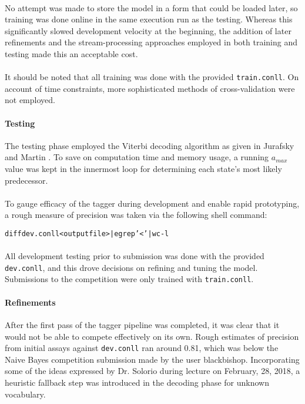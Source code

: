 \documentclass[11pt,a4paper]{article}
\begin{document}
\paragraph{}
No attempt was made to store the model in a form that could be loaded later,
so training was done online in the same execution run as the testing.
Whereas this significantly slowed development velocity at the beginning,
the addition of later refinements and the stream-processing approaches
employed in both training and testing made this an acceptable cost.

\paragraph{}
It should be noted that all training was done with the provided \texttt{train.conll}.
On account of time constraints, more sophisticated methods of cross-validation \cite[86-87]{JurafskyMartin}
were not employed.

\paragraph{Testing}
The testing phase employed the Viterbi decoding algorithm as given in Jurafsky and
Martin . To save on computation time and memory usage,
a running $a_{max}$ value was kept in the innermost loop for determining each
state's most likely predecessor.

\paragraph{}
To gauge efficacy of the tagger during development and enable rapid prototyping,
a rough measure of precision was taken via the following shell command:

\begin{alltt}
  \tiny{diff dev.conll <output file> | egrep '<' | wc -l}
\end{alltt}

\paragraph{}
All development testing prior to submission was done with the provided
\texttt{dev.conll}, and this drove decisions on refining and tuning the model.
Submissions to the competition were only trained with \texttt{train.conll}.

\paragraph{Refinements}
After the first pass of the tagger pipeline was completed, it was clear that it would
not be able to compete effectively on its own. Rough estimates of precision from
initial assays against \texttt{dev.conll} ran around 0.81, which was below the
Naive Bayes competition submission made by the user blackbishop.
Incorporating some of the ideas expressed by Dr. Solorio during lecture on February, 28, 2018,
a heuristic fallback step was introduced in the decoding phase for unknown vocabulary.
\end{document}
